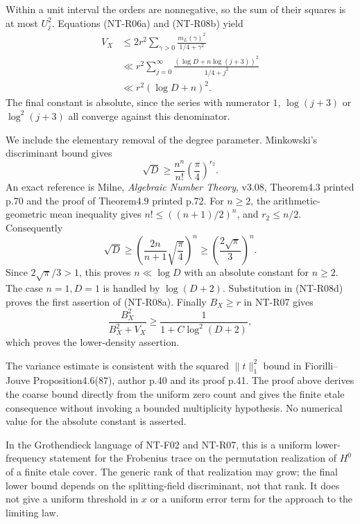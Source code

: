 Within a unit interval the orders are nonnegative, so the sum
of their squares is at most $U_j^2$. Equations (NT-R06a) and
(NT-R08b) yield
\[
 \begin{split}
 V_X
 &\le 2r^2\sum_{\gamma>0}
                  \frac{m_L(\gamma)^2}{1/4+\gamma^2}\\
 &\ll r^2\sum_{j=0}^{\infty}
          \frac{(\log D+n\log(j+3))^2}{1/4+j^2}\\
 &\ll r^2(\log D+n)^2.
 \end{split}
 \tag{NT-R08d}
\]
The final constant is absolute, since the series with numerator
$1$, $\log(j+3)$ or $\log^2(j+3)$ all converge against this
denominator.

We include the elementary removal of the degree parameter.
Minkowski's discriminant bound gives
\[
 \sqrt D\ge\frac{n^n}{n!}\left(\frac{\pi}{4}\right)^{r_2}.
\]
An exact reference is Milne, \emph{Algebraic Number Theory},
v3.08, Theorem4.3 printed p.70 and the proof of Theorem4.9
printed p.72. For $n\ge2$, the arithmetic-geometric mean
inequality gives $n!\le((n+1)/2)^n$, and $r_2\le n/2$.
Consequently
\[
 \sqrt D\ge
 \left(\frac{2n}{n+1}\sqrt{\frac{\pi}{4}}\right)^n
 \ge\left(\frac{2\sqrt\pi}{3}\right)^n.
\]
Since $2\sqrt\pi/3>1$, this proves
$n\ll\log D$ with an absolute constant for $n\ge2$.
The case $n=1,D=1$ is handled by $\log(D+2)$.
Substitution in (NT-R08d) proves the first assertion of
(NT-R08a). Finally $B_X\ge r$ in NT-R07 gives
\[
 \frac{B_X^2}{B_X^2+V_X}
 \ge \frac1{1+C\log^2(D+2)},
\]
which proves the lower-density assertion.

The variance estimate is consistent with the squared
$\|t\|_1^2$ bound in Fiorilli--Jouve Proposition4.6(87),
author p.40 and its proof p.41. The proof above derives the
coarse bound directly from the uniform zero count and gives
the finite etale consequence without invoking a bounded
multiplicity hypothesis. No numerical value for the absolute
constant is asserted.

In the Grothendieck language of NT-F02 and NT-R07, this is a
uniform lower-frequency statement for the Frobenius trace on
the permutation realization of $H^0$ of a finite etale cover.
The generic rank of that realization may grow; the final lower
bound depends on the splitting-field discriminant, not that
rank. It does not give a uniform threshold in $x$ or a uniform
error term for the approach to the limiting law.
